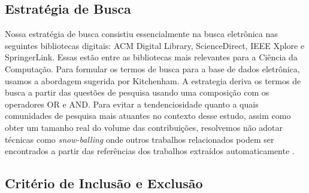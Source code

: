 \subsection{Estratégia de Busca}\label{estrategia_busca}
Nossa estratégia de busca consistiu essencialmente na busca eletrônica nas seguintes bibliotecas digitais: ACM Digital Library, ScienceDirect, IEEE Xplore e SpringerLink. Essas estão entre as bibliotecas mais relevantes para a Ciência da Computação. Para formular os termos de busca para a base de dados eletrônica, usamos a abordagem sugerida por Kitchenham\cite{Barbara Kitchenham}. A estrategia deriva os termos de busca a partir das questões de pesquisa  usando uma composição com os operadores OR e AND. Para evitar a tendenciosidade quanto a quais comunidades de pesquisa mais atuantes no contexto desse estudo, assim como obter um tamanho real do volume das contribuições, resolvemos não adotar técnicas como \emph{snow-balling} onde outros trabalhos relacionados podem ser encontrados a partir das referências dos trabalhos extraídos automaticamente \cite{VIDE Using Mapping Studies in Software Engineering (Proc. of PPIG 2008}.

\begin{center}

\end{center}

\subsection{Crit\'{e}rio de Inclusão e Exclusão}

